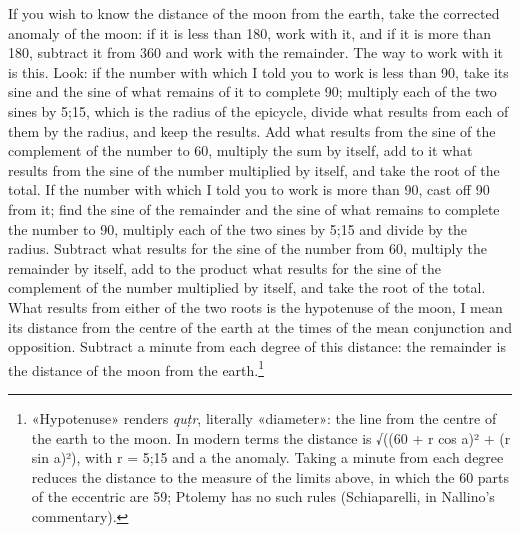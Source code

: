 \documentclass[11pt]{article}
\newcommand{\ArPage}[1]{\marginpar{\footnotesize\color{gray}Ar.\,p.\,#1}}
\begin{document}
\par \ArPage{117}If you wish to know the distance of the moon from the earth, take the corrected anomaly of the moon: if it is less than 180, work with it, and if it is more than 180, subtract it from 360 and work with the remainder. The way to work with it is this. Look: if the number with which I told you to work is less than 90, take its sine and the sine of what remains of it to complete 90; multiply each of the two sines by 5;15, which is the radius of the epicycle, divide what results from each of them by the radius, and keep the results. Add what results from the sine of the complement of the number to 60, multiply the sum by itself, add to it what results from the sine of the number multiplied by itself, and take the root of the total. If the number with which I told you to work is more than 90, cast off 90 from it; find the sine of the remainder and the sine of what remains to complete the number to 90, multiply each of the two sines by 5;15 and divide by the radius. Subtract what results for the sine of the number from 60, multiply the remainder by itself, add to the product what results for the sine of the complement of the number multiplied by itself, and take the root of the total. What results from either of the two roots is the hypotenuse of the moon, I mean its distance from the centre of the earth at the times of the mean conjunction and opposition. Subtract a minute from each degree of this distance: the remainder is the distance of the moon from the earth.\footnote{«Hypotenuse» renders \emph{quṭr}, literally «diameter»: the line from the centre of the earth to the moon. In modern terms the distance is √((60 + r cos a)² + (r sin a)²), with r = 5;15 and a the anomaly. Taking a minute from each degree reduces the distance to the measure of the limits above, in which the 60 parts of the eccentric are 59; Ptolemy has no such rules (Schiaparelli, in Nallino's commentary).}\par
\end{document}
